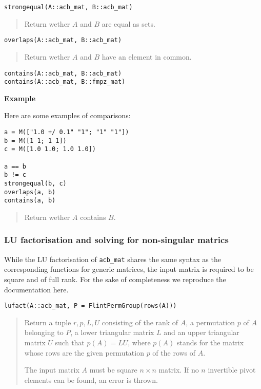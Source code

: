 \documentclass[a4paper,10pt]{article}
\newcommand{\code}{\lstinline}
\newcommand{\desc}[1]{\vspace{-3mm}\begin{quote}#1\end{quote}}
\begin{document}
{{\begin{lstlisting}
strongequal(A::acb_mat, B::acb_mat)
\end{lstlisting}

\desc{Return wether $A$ and $B$ are equal as sets.}

\begin{lstlisting}
overlaps(A::acb_mat, B::acb_mat)
\end{lstlisting}

\desc{Return wether $A$ and $B$ have an element in common.}

\begin{lstlisting}
contains(A::acb_mat, B::acb_mat)
contains(A::acb_mat, B::fmpz_mat)
\end{lstlisting}

\textbf{Example}

Here are some examples of comparisons:

\begin{lstlisting}
a = M(["1.0 +/ 0.1" "1"; "1" "1"])
b = M([1 1; 1 1])
c = M([1.0 1.0; 1.0 1.0])

a == b
b != c
strongequal(b, c)
overlaps(a, b)
contains(a, b)
\end{lstlisting}

\desc{Return wether $A$ contains $B$.}

\subsubsection{LU factorisation and solving for non-singular matrics}

While the LU factorisation of \code{acb_mat} shares the same syntax
as the corresponding functions for generic matrices, the input matrix
is required to be square and of full rank. For the sake of completeness
we reproduce the documentation here.

\begin{lstlisting}
lufact(A::acb_mat, P = FlintPermGroup(rows(A)))
\end{lstlisting}

\desc{Return a tuple $r, p, L, U$ consisting of the rank of $A$, a permutation
$p$ of $A$ belonging to $P$, a lower triangular matrix $L$ and an upper
triangular matrix $U$ such that $p(A) = LU$, where $p(A)$ stands for the
matrix whose rows are the given permutation $p$ of the rows of $A$.

The input matrix $A$ must be square $n\times n$ matrix. If no $n$ invertible
pivot elements can be found, an error is thrown.}

}}
\end{document}
